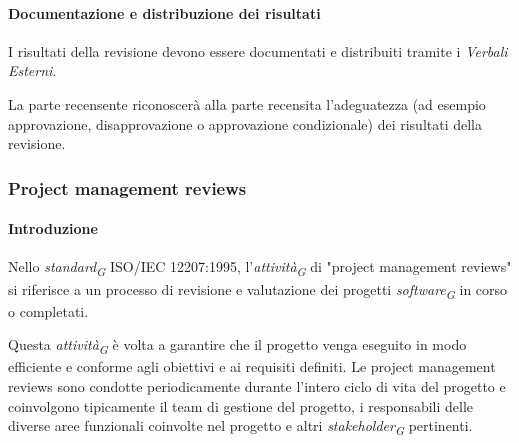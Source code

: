 
\paragraph{Documentazione e distribuzione dei risultati}
I risultati della revisione devono essere documentati e distribuiti tramite i \textit{Verbali Esterni}.

La parte recensente riconoscerà alla parte recensita l'adeguatezza (ad esempio approvazione, disapprovazione o approvazione condizionale) dei risultati della revisione. 

\subsubsection{Project management reviews}

\paragraph{Introduzione}
Nello \textit{standard}\textsubscript{\textit{G}} ISO/IEC 12207:1995, l'\textit{attività}\textsubscript{\textit{G}} di "project management reviews" si riferisce a un processo di revisione e valutazione dei progetti \textit{software}\textsubscript{\textit{G}} in corso o completati.

\vspace{0.2cm}

Questa \textit{attività}\textsubscript{\textit{G}} è volta a garantire che il progetto venga eseguito in modo efficiente e conforme agli obiettivi e ai requisiti definiti.
Le project management reviews sono condotte periodicamente durante l'intero ciclo di vita del progetto e coinvolgono tipicamente il team di gestione del progetto, i responsabili delle diverse aree funzionali coinvolte nel progetto e altri \textit{stakeholder}\textsubscript{\textit{G}} pertinenti.

